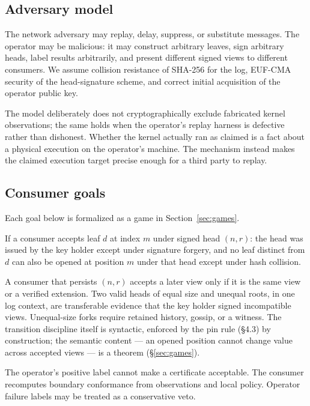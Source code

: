 \documentclass[11pt]{article}
\theoremstyle{remark}
\begin{document}
\subsection{Adversary model}

The network adversary may replay, delay, suppress, or substitute messages. The
operator may be malicious: it may construct arbitrary leaves, sign arbitrary
heads, label results arbitrarily, and present different signed views to
different consumers. We assume collision resistance of SHA-256 for the log,
EUF-CMA security of the head-signature scheme, and correct initial acquisition
of the operator public key.

The model deliberately does not cryptographically exclude fabricated kernel
observations; the same holds when the operator's replay harness is defective
rather than dishonest. Whether the kernel actually ran as claimed is a
fact about a physical execution on the operator's machine. The mechanism instead makes the claimed execution target precise
enough for a third party to replay.

\subsection{Consumer goals}

Each goal below is formalized as a game in Section~\ref{sec:games}.

\begin{description}[leftmargin=1.5em,itemsep=5pt]
\item[G1: Authentic position binding.] If a consumer accepts leaf $d$ at
index $m$ under signed head $(n,r)$: the head was issued by the key holder
except under signature forgery, and no leaf distinct from $d$ can also be
opened at position $m$ under that head except under hash collision.
\item[G2: Local append-only history.] A consumer that persists $(n,r)$ accepts
a later view only if it is the same view or a verified extension. Two valid
heads of equal size and unequal roots, in one log context, are transferable
evidence that the key holder signed incompatible views. Unequal-size forks
require retained history, gossip, or a witness. The transition discipline
itself is syntactic, enforced by the pin rule (\S4.3) by construction; the semantic
content --- an opened position cannot change value across accepted views ---
is a theorem (\S\ref{sec:games}).
\item[G3: Policy separation.] The operator's positive label cannot make a
certificate acceptable. The consumer recomputes boundary conformance from
observations and local policy. Operator failure labels may be treated as a
conservative veto.
\end{description}
\end{document}

